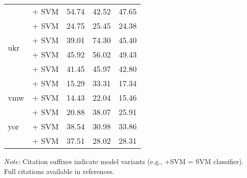 \begin{table*}[ht]
\begin{tabular}{@{}llp{1.1cm}p{1.1cm}p{1.1cm}@{}}
        \midrule
        \multirow{6}{*}{ukr}               & \citep{wang2024multilingual} + SVM                                 & 54.74                           & 42.52                              & 47.65                             \\
                                           & \citep{schweter2020electraukrainian} + SVM                         & 24.75                           & 25.45                              & 24.38                             \\
                                           & \citep{snegirev2025russianfocusedembeddersexplorationrumteb} + SVM & 39.01                           & 74.30                              & 45.40                             \\
                                           & \citep{sturua2024jinaembeddingsv3multilingualembeddingstask} + SVM & 45.92                           & 56.02                              & 49.43                             \\
                                           & \citep{laba-etal-2023-contextual} + SVM                            & 41.45                           & 45.97                              & 42.80                             \\
                                           & \citep{minixhofer2023robertaukraine} + SVM                         & 15.29                           & 33.31                              & 17.34                             \\
        \midrule
        vmw                                & \citep{wang2024multilingual} + SVM                                 & 14.43                           & 22.04                              & 15.46                             \\
        \midrule
        \multirow{3}{*}{yor}               & \citep{feng2022languageagnosticbertsentenceembedding} + SVM        & 20.88                           & 38.07                              & 25.91                             \\
                                           & \citep{wang2024multilingual} + SVM                                 & 38.54                           & 30.98                              & 33.86                             \\
                                           & \citep{reimers2020makingmonolingualsentenceembeddings} + SVM       & 37.51                           & 28.02                              & 28.31                             \\

        \bottomrule
    \end{tabular}
    \vspace{-2mm}
    \begin{flushleft}
        \scriptsize\textit{Note:} Citation suffixes indicate model variants (e.g., +SVM = SVM classifier). Full citations available in references.
    \end{flushleft}
\end{table*}